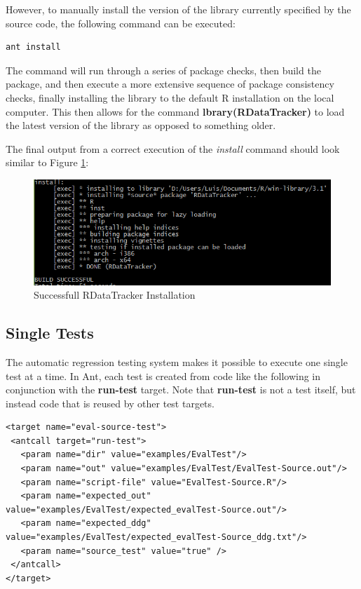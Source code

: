 \documentclass[12pt]{article}
\begin{document}
\bigskip

However, to  manually install the version of the library currently specified by the source code, the following command can be executed:
\begin{lstlisting}
ant install
\end{lstlisting}
The command will run through a series of package checks, then build the package, and then execute a more extensive sequence of package consistency checks, finally installing the library to the default R installation on the local computer. This then allows for the command \textbf{lbrary(RDataTracker)} to load the latest version of the library as opposed to something older. 

\bigskip

The final output from a correct execution of the \textit{install} command should look similar to Figure \ref{fig:success_install}:

\begin{figure}
\caption{Successfull RDataTracker Installation}
\label{fig:success_install}
\begin{center}
\includegraphics[scale=0.6]{UsingRDataTrackerTests-img/install-out.PNG}
\end{center}
\end{figure}


\subsection{Single Tests}
\label{section:single_test}
The automatic regression testing system makes it possible to execute one single test at a time. In Ant, each test is created from code like the following in conjunction with the \textbf{run-test} target. Note that \textbf{run-test} is not a test itself, but instead code that is reused by other test targets. 
\begin{lstlisting}
<target name="eval-source-test">
 <antcall target="run-test">
   <param name="dir" value="examples/EvalTest"/>
   <param name="out" value="examples/EvalTest/EvalTest-Source.out"/>
   <param name="script-file" value="EvalTest-Source.R"/>
   <param name="expected_out" value="examples/EvalTest/expected_evalTest-Source.out"/>
   <param name="expected_ddg" value="examples/EvalTest/expected_evalTest-Source_ddg.txt"/>
   <param name="source_test" value="true" />
 </antcall>
</target>
\end{lstlisting}
\end{document}
